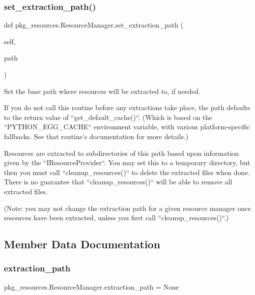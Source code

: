 \subsubsection{\texorpdfstring{set\+\_\+extraction\+\_\+path()}{set\_extraction\_path()}}
{\footnotesize\ttfamily def pkg\+\_\+resources.\+Resource\+Manager.\+set\+\_\+extraction\+\_\+path (\begin{DoxyParamCaption}\item[{}]{self,  }\item[{}]{path }\end{DoxyParamCaption})}

\begin{DoxyVerb}Set the base path where resources will be extracted to, if needed.

If you do not call this routine before any extractions take place, the
path defaults to the return value of ``get_default_cache()``.  (Which
is based on the ``PYTHON_EGG_CACHE`` environment variable, with various
platform-specific fallbacks.  See that routine's documentation for more
details.)

Resources are extracted to subdirectories of this path based upon
information given by the ``IResourceProvider``.  You may set this to a
temporary directory, but then you must call ``cleanup_resources()`` to
delete the extracted files when done.  There is no guarantee that
``cleanup_resources()`` will be able to remove all extracted files.

(Note: you may not change the extraction path for a given resource
manager once resources have been extracted, unless you first call
``cleanup_resources()``.)
\end{DoxyVerb}
 

\subsection{Member Data Documentation}
\mbox{\label{classpkg__resources_1_1_resource_manager_a6120904625d6624b7ecae0f9175ea9dd}} 
\subsubsection{\texorpdfstring{extraction\+\_\+path}{extraction\_path}}
{\footnotesize\ttfamily pkg\+\_\+resources.\+Resource\+Manager.\+extraction\+\_\+path = None\hspace{0.3cm}{\ttfamily [static]}}

